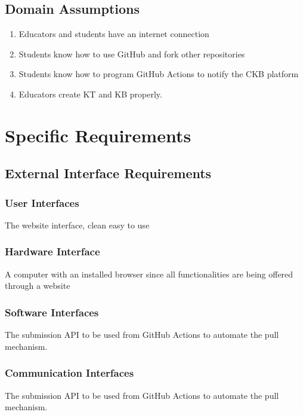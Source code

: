 \documentclass[11pt]{report}
\begin{document}
\section{Domain Assumptions}
    \begin{enumerate}[label=(D\arabic*), font=\itshape]
        \item Educators and students have an internet connection
        \item Students know how to use GitHub and fork other repositories
        \item Students know how to program GitHub Actions to notify the CKB platform
        \item Educators create KT and KB properly.
    \end{enumerate}


\chapter{Specific Requirements}

\section{External Interface Requirements}

\subsection{User Interfaces}
The website interface, clean easy to use

\subsection{Hardware Interface}
A computer with an installed browser since all functionalities are being offered through a website

\subsection{Software Interfaces}
The submission API to be used from GitHub Actions to automate the pull mechanism.

\subsection{Communication Interfaces}
The submission API to be used from GitHub Actions to automate the pull mechanism.
\end{document}
